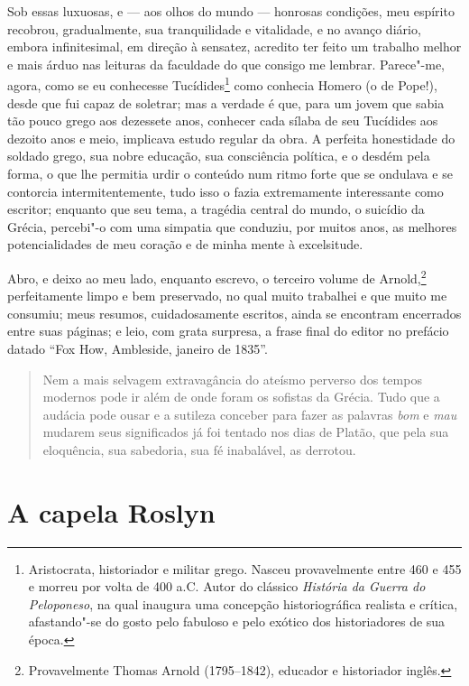 Sob essas luxuosas, e --- aos olhos do mundo --- honrosas condições,
meu espírito recobrou, gradualmente, sua tranquilidade e vitalidade, e
no avanço diário, embora infinitesimal, em direção à sensatez, acredito
ter feito um trabalho melhor e mais árduo nas leituras da faculdade do
que consigo me lembrar. Parece"-me, agora, como se eu conhecesse
Tucídides\footnote{Aristocrata, historiador e militar grego. Nasceu
  provavelmente entre 460 e 455 e morreu por volta de 400 a.C. Autor
  do clássico \textit{História da Guerra do Peloponeso}, na qual
  inaugura uma concepção historiográfica realista e crítica,
  afastando"-se do gosto pelo fabuloso e pelo exótico dos historiadores
  de sua época.} como conhecia Homero (o de Pope!), desde
que fui capaz de soletrar; mas a verdade é que, para um jovem que sabia
tão pouco grego aos dezessete anos, conhecer cada sílaba de seu
Tucídides aos dezoito anos e meio, implicava estudo regular da obra. A
perfeita honestidade do soldado grego, sua nobre educação, sua
consciência política, e o desdém pela forma, o que lhe permitia urdir o
conteúdo num ritmo forte que se ondulava e se contorcia
intermitentemente, tudo isso o fazia extremamente interessante como
escritor; enquanto que seu tema, a tragédia central do mundo, o suicídio
da Grécia, percebi"-o com uma simpatia que conduziu, por muitos anos, as
melhores potencialidades de meu coração e de minha mente à excelsitude.

Abro, e deixo ao meu lado, enquanto escrevo, o terceiro volume de
Arnold,\footnote{Provavelmente Thomas Arnold (1795--1842), educador e
  historiador inglês.} perfeitamente limpo e bem
preservado, no qual muito trabalhei e que muito me consumiu; meus
resumos, cuidadosamente escritos, ainda se encontram encerrados entre
suas páginas; e leio, com grata surpresa, a frase final do editor no
prefácio datado ``Fox How, Ambleside, janeiro de 1835''.

\begin{quote}
Nem a mais selvagem extravagância do ateísmo perverso dos tempos
modernos pode ir além de onde foram os sofistas da Grécia. Tudo que a
audácia pode ousar e a sutileza conceber para fazer as palavras \textit{bom}
e \textit{mau} mudarem seus significados já foi tentado nos dias de Platão,
que pela sua eloquência, sua sabedoria, sua fé inabalável, as
derrotou.
\end{quote}

\chapter{A capela Roslyn} %

